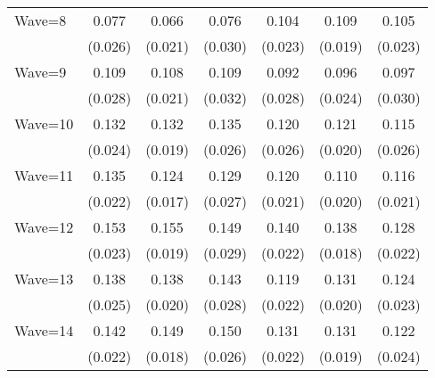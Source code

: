 {\begin{tabular}{l*{6}{c}}
Wave=8              &       0.077\sym{***}&       0.066\sym{***}&       0.076\sym{**} &       0.104\sym{***}&       0.109\sym{***}&       0.105\sym{***}\\
                    &     (0.026)         &     (0.021)         &     (0.030)         &     (0.023)         &     (0.019)         &     (0.023)         \\
Wave=9              &       0.109\sym{***}&       0.108\sym{***}&       0.109\sym{***}&       0.092\sym{***}&       0.096\sym{***}&       0.097\sym{***}\\
                    &     (0.028)         &     (0.021)         &     (0.032)         &     (0.028)         &     (0.024)         &     (0.030)         \\
Wave=10             &       0.132\sym{***}&       0.132\sym{***}&       0.135\sym{***}&       0.120\sym{***}&       0.121\sym{***}&       0.115\sym{***}\\
                    &     (0.024)         &     (0.019)         &     (0.026)         &     (0.026)         &     (0.020)         &     (0.026)         \\
Wave=11             &       0.135\sym{***}&       0.124\sym{***}&       0.129\sym{***}&       0.120\sym{***}&       0.110\sym{***}&       0.116\sym{***}\\
                    &     (0.022)         &     (0.017)         &     (0.027)         &     (0.021)         &     (0.020)         &     (0.021)         \\
Wave=12             &       0.153\sym{***}&       0.155\sym{***}&       0.149\sym{***}&       0.140\sym{***}&       0.138\sym{***}&       0.128\sym{***}\\
                    &     (0.023)         &     (0.019)         &     (0.029)         &     (0.022)         &     (0.018)         &     (0.022)         \\
Wave=13             &       0.138\sym{***}&       0.138\sym{***}&       0.143\sym{***}&       0.119\sym{***}&       0.131\sym{***}&       0.124\sym{***}\\
                    &     (0.025)         &     (0.020)         &     (0.028)         &     (0.022)         &     (0.020)         &     (0.023)         \\
Wave=14             &       0.142\sym{***}&       0.149\sym{***}&       0.150\sym{***}&       0.131\sym{***}&       0.131\sym{***}&       0.122\sym{***}\\
                    &     (0.022)         &     (0.018)         &     (0.026)         &     (0.022)         &     (0.019)         &     (0.024)         \\

\end{tabular}}
